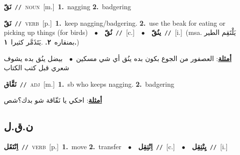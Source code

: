 \documentclass[10pt,a4paper,twoside]{article} %
\begin{document}
\begin{multicols}{2}
{\setlength\topsep{0pt}\textbf{\foreignlanguage{arabic}{نَقّ}}\ {\color{gray}\texttt{//}\color{black}}\ \textsc{noun}\ [m.]\ \textbf{1.}~nagging  \textbf{2.}~badgering\ } \vspace{2mm}

{\setlength\topsep{0pt}\textbf{\foreignlanguage{arabic}{نَقّ}}\ {\color{gray}\texttt{//}\color{black}}\ \textsc{verb}\ [p.]\ \textbf{1.}~keep nagging/badgering.  \textbf{2.}~use the beak for eating or picking up things (for birds)\ \ $\bullet$\ \ \setlength\topsep{0pt}\textbf{\foreignlanguage{arabic}{نُقّ}}\ {\color{gray}\texttt{//}\color{black}}\ [c.]\ \ $\bullet$\ \ \setlength\topsep{0pt}\textbf{\foreignlanguage{arabic}{ينُقّ}}\ {\color{gray}\texttt{//}\color{black}}\ [i.]\ \color{gray}(msa. \foreignlanguage{arabic}{يَلْتَقِم الطير بمنقاره}~\foreignlanguage{arabic}{\textbf{٢.}}  .\foreignlanguage{arabic}{يَتَذَمَّر كثيرا}~\foreignlanguage{arabic}{\textbf{١.}})\color{black}\  \begin{flushright}\color{gray}\foreignlanguage{arabic}{\textbf{\underline{\foreignlanguage{arabic}{أمثلة}}}: العصفور من الجوع بكون بده ينُق أي شي مسكين\ $\bullet$\ \  بيضل ينُق بده يشوف شعري قبل كتب الكتاب}\end{flushright}\color{black}} \vspace{2mm}

{\setlength\topsep{0pt}\textbf{\foreignlanguage{arabic}{نَقَّاق}}\ {\color{gray}\texttt{//}\color{black}}\ \textsc{adj}\ [m.]\ \textbf{1.}~sb who keeps nagging.  \textbf{2.}~badgering\  \begin{flushright}\color{gray}\foreignlanguage{arabic}{\textbf{\underline{\foreignlanguage{arabic}{أمثلة}}}: احكي يا نَقّاقة شو بدك؟شص}\end{flushright}\color{black}} \vspace{2mm}

\vspace{-3mm}
\subsection*{\color{blue}\foreignlanguage{arabic}{ن.ق.ل}\color{blue}{}} 

{\setlength\topsep{0pt}\textbf{\foreignlanguage{arabic}{اِنْتَقَل}}\ {\color{gray}\texttt{//}\color{black}}\ \textsc{verb}\ [p.]\ \textbf{1.}~move  \textbf{2.}~transfer\ \ $\bullet$\ \ \setlength\topsep{0pt}\textbf{\foreignlanguage{arabic}{اِنْتِقِل}}\ {\color{gray}\texttt{//}\color{black}}\ [c.]\ \ $\bullet$\ \ \setlength\topsep{0pt}\textbf{\foreignlanguage{arabic}{يِنْتِقِل}}\ {\color{gray}\texttt{//}\color{black}}\ [i.]\ } \vspace{2mm}


\end{multicols}
\end{document}
